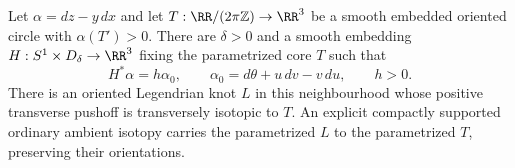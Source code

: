 \begin{lemma}
\label{fd:transverse-neighborhood}\leanok
Let $\alpha=dz-y\,dx$ and let
$T:\RR/(2\pi\mathbb Z)\to\RR^3$ be a smooth embedded oriented circle
with $\alpha(T')>0$. There are $\delta>0$ and a smooth embedding
$H:S^1\times D_\delta\to\RR^3$ fixing the parametrized core $T$ such that
\begin{equation}\label{fd:transverse-model}
 H^*\alpha=h\alpha_0,\qquad
 \alpha_0=d\theta+u\,dv-v\,du,\qquad h>0.
\end{equation}
There is an oriented Legendrian knot $L$ in this neighbourhood whose
positive transverse pushoff is transversely isotopic to $T$. An explicit
compactly supported ordinary ambient isotopy carries the parametrized
$L$ to the parametrized $T$, preserving their orientations.

\end{lemma}
